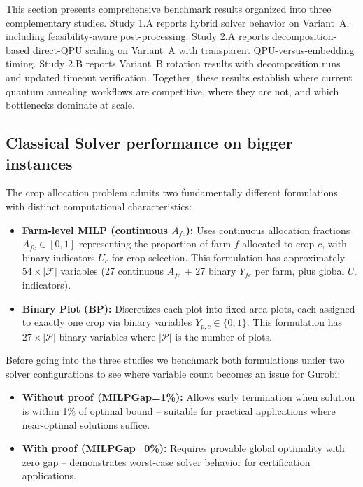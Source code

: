 \documentclass{oqireport}
\begin{document}
This section presents comprehensive benchmark results organized into three complementary studies. Study 1.A reports hybrid solver behavior on Variant~A, including feasibility-aware post-processing. Study 2.A reports decomposition-based direct-QPU scaling on Variant~A with transparent QPU-versus-embedding timing. Study 2.B reports Variant~B rotation results with decomposition runs and updated timeout verification. Together, these results establish where current quantum annealing workflows are competitive, where they are not, and which bottlenecks dominate at scale.


\subsection{Classical Solver performance on bigger instances}


The crop allocation problem admits two fundamentally different formulations with distinct computational characteristics:

\begin{itemize}
    \item \textbf{Farm-level MILP (continuous $A_{fc}$):} Uses continuous allocation fractions $A_{fc} \in [0,1]$ representing the proportion of farm $f$ allocated to crop $c$, with binary indicators $U_c$ for crop selection. This formulation has approximately $54 \times |\mathcal{F}|$ variables (27 continuous $A_{fc}$ + 27 binary $Y_{fc}$ per farm, plus global $U_c$ indicators).
    
    \item \textbf{Binary Plot (BP):} Discretizes each plot into fixed-area plots, each assigned to exactly one crop via binary variables $Y_{p,c} \in \{0,1\}$. This formulation has $27 \times |\mathcal{P}|$ binary variables where $|\mathcal{P}|$ is the number of plots.
\end{itemize}

Before going into the three studies we benchmark both formulations under two solver configurations to see where variable count becomes an issue for Gurobi:
\begin{itemize}
    \item \textbf{Without proof (MILPGap=1\%):} Allows early termination when solution is within 1\% of optimal bound -- suitable for practical applications where near-optimal solutions suffice.
    \item \textbf{With proof (MILPGap=0\%):} Requires provable global optimality with zero gap -- demonstrates worst-case solver behavior for certification applications.
\end{itemize}
\end{document}
